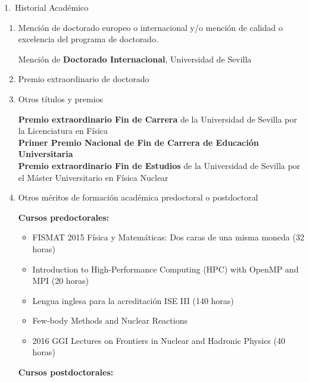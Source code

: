 \documentclass{resume2} %
\begin{document}
\begin{rSection}{1.~Historial Acad\'emico}
\begin{enumerate}[label=\alph*.]
{\bf Universidad de Sevilla}\hfill{29/10/2018}\\
{\em A Transfer to the Continuum formalism for the study of $(p, pn)$ and $(p, 2p)$ reactions on unstable nuclei} \\
Calificaci\'on: Cum Laude 10/10\\


\item Menci\'on de doctorado europeo o internacional y/o menci\'on de calidad o excelencia del programa de doctorado.

Mención de \textbf{Doctorado Internacional}, Universidad de Sevilla

\item Premio extraordinario de doctorado

\item Otros t\'itulos y premios

\textbf{Premio extraordinario Fin de Carrera} de la Universidad de Sevilla por la Licenciatura en F\'isica\\

\textbf{Primer Premio Nacional de Fin de Carrera de Educaci\'on Universitaria} \\

\textbf{Premio extraordinario Fin de Estudios} de la Universidad de Sevilla por el M\'aster Universitario en F\'isica Nuclear 

\item Otros méritos de formación acad\'emica predoctoral o postdoctoral

{\sc \bf Cursos predoctorales:}
\begin{itemize}
\item FISMAT 2015 F\'isica y Matem\'aticas: Dos caras de una misma moneda (32 horas)
\item Introduction to High-Performance Computing (HPC) with OpenMP and MPI
(20 horas)
\item Lengua inglesa para la acreditación ISE III (140 horas)
\item Few-body Methods and Nuclear Reactions
\item 2016 GGI Lectures on Frontiers in Nuclear and Hadronic Physics (40 horas)

\end{itemize}

{\sc \bf Cursos postdoctorales:}

\end{enumerate}

\end{rSection}
\end{document}

